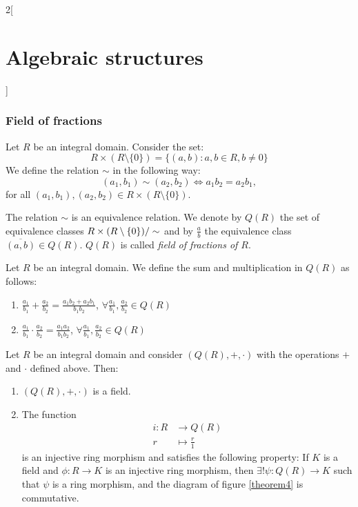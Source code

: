 \documentclass[../../../main.tex]{subfiles}
\begin{document}
\begin{multicols}{2}[\section{Algebraic structures}]
  \subsubsection{Field of fractions}
  \begin{definition}
    Let $R$ be an integral domain. Consider the set: $$R\times(R\setminus\{0\})=\{(a,b):a,b\in R,b\ne 0\}$$ We define the relation $\sim$ in the following way: $$(a_1,b_1)\sim(a_2,b_2)\iff a_1b_2=a_2b_1,$$ for all $(a_1,b_1),(a_2,b_2)\in R\times(R\setminus\{0\})$.
  \end{definition}
  \begin{lemma}
    The relation $\sim$ is an equivalence relation. We denote by $Q(R)$ the set of equivalence classes $\quot{R\times(R\setminus\{0\})}{\sim}$ and by $\frac{a}{b}$ the equivalence class $\overline{(a,b)}\in Q(R)$. $Q(R)$ is called \textit{field of fractions of $R$}.
  \end{lemma}
  \begin{definition}
    Let $R$ be an integral domain. We define the sum and multiplication in $Q(R)$ as follows:
    \begin{enumerate}
      \item $\frac{a_1}{b_1}+\frac{a_2}{b_2}=\frac{a_1b_2+a_2b_1}{b_1b_2}$, $\forall\frac{a_1}{b_1},\frac{a_2}{b_2}\in Q(R)$
      \item $\frac{a_1}{b_1}\cdot\frac{a_2}{b_2}=\frac{a_1a_2}{b_1b_2}$, $\forall\frac{a_1}{b_1},\frac{a_2}{b_2}\in Q(R)$
    \end{enumerate}
  \end{definition}
  \begin{theorem}
    Let $R$ be an integral domain and consider $(Q(R),+,\cdot)$ with the operations $+$ and $\cdot$ defined above. Then:
    \begin{enumerate}
      \item $(Q(R),+,\cdot)$ is a field.
      \item The function
            \begin{align*}
              i:R & \longrightarrow Q(R)    \\
              r   & \longmapsto \frac{r}{1}
            \end{align*}
            is an injective ring morphism and satisfies the following property: If $K$ is a field and $\phi:R\rightarrow K$ is an injective ring morphism, then $\exists!\psi:Q(R)\rightarrow K$ such that $\psi$ is a ring morphism, and the diagram of figure \ref{theorem4} is commutative.
    \end{enumerate}
    \begin{center}
      \begin{minipage}{\linewidth}
        \centering
        
        \label{theorem4}
      \end{minipage}
    \end{center}
  \end{theorem}

\end{multicols}
\end{document}
